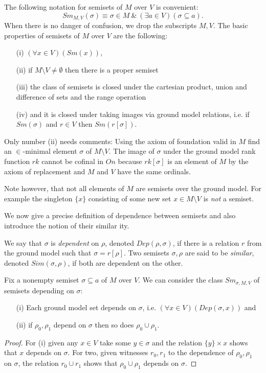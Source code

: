 The following notation for semisets of $M$ over $V$ is convenient:
$$
Sm_{M,V}(\sigma)\equiv\sigma\in M\ \&\ (\exists a\in V)(\sigma\subseteq a).
$$
When there is no danger of confusion, we drop the subscripts $M,V$.
The basic properties of semisets of $M$ over $V$ are the following:

\begin{itemize}
 \item[(i)] $(\forall x\in V)(Sm(x))$,
 \item[(ii)] if $M\setminus V\neq\emptyset$ then there is a proper semiset
 \item[(iii)] the class of semisets is closed under the cartesian product,
 union and difference of sets and the range operation
 \item[(iv)] and it is closed under taking images via ground model relations, i.e. if $Sm(\sigma)$ and $r\in V$ then $Sm(r[\sigma])$.
\end{itemize}

Only number (ii) needs comments: Using the axiom of
foundation valid in $M$ find an $\in$-minimal element $\sigma$ of
$M\setminus V$. The image of $\sigma$ under the ground model rank function
$rk$ cannot be cofinal in $On$ because $rk[\sigma]$ is an element of $M$
by the axiom of replacement and $M$ and $V$ have the same ordinals.

Note however, that not all elements of $M$ are semisets over the ground model.
For example the singleton $\{x\}$ consisting of some new set $x\in M\setminus V$
is \emph{not} a semiset.

We now give a precise definition of dependence between semisets and also
introduce the notion of their similar
ity.

\begin{definition}\label{similarity}
We say that $\sigma$ is \emph{dependent} on $\rho$, denoted $Dep(\rho,\sigma)$, if there
is a relation $r$ from the ground model such that $\sigma = r[\rho]$.
Two semisets $\sigma,\rho$ are said to be \emph{similar}, denoted $Sim(\sigma,\rho)$, if both are
dependent on the other.
\end{definition}

Fix a nonempty semiset $\sigma\subseteq a$ of $M$ over $V$. We can consider the class $Sm_{\sigma,M,V}$
of semisets depending on $\sigma$:

\begin{fact}
 \begin{itemize}
  \item[(i)] Each ground model set depends on $\sigma$, i.e. $(\forall x\in V)(Dep(\sigma,x))$ and
  \item[(ii)] if $\rho_0,\rho_1$ depend on $\sigma$ then so does $\rho_0\cup\rho_1$.
 \end{itemize}
\end{fact}
\begin{proof}
 For (i) given any $x\in V$ take some $y\in\sigma$ and the relation $\{y\}\times x$ shows that
 $x$ depends on $\sigma$. For two, given witnesses $r_0,r_1$ to the dependence of $\rho_0,\rho_1$ on $\sigma$,
 the relation $r_0\cup r_1$ shows that $\rho_0\cup\rho_1$ depends on $\sigma$.
\end{proof}

